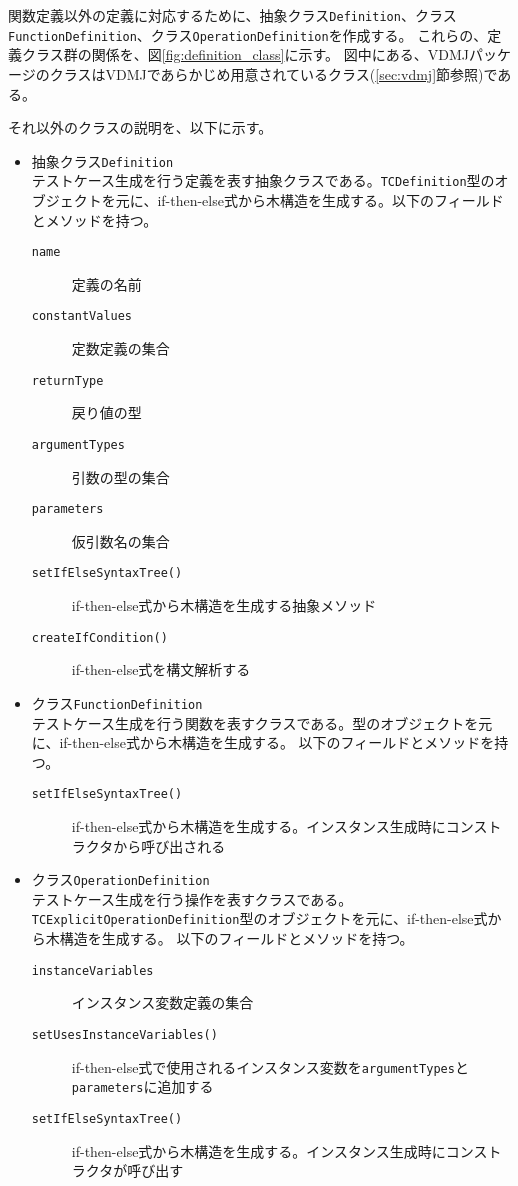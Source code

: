 \documentclass[uplatex, report, a4j, 10pt]{jsbook}
\newcommand\ttt[1]{\texttt{#1}}
\begin{document}
関数定義以外の定義に対応するために、抽象クラス\ttt{Definition}、クラス\ttt{FunctionDefinition}、クラス\ttt{OperationDefinition}を作成する。
これらの、定義クラス群の関係を、図\ref{fig:definition_class}に示す。
図中にある、VDMJパッケージのクラスはVDMJであらかじめ用意されているクラス(\ref{sec:vdmj}節参照)である。

それ以外のクラスの説明を、以下に示す。

\begin{itemize}
  \item 抽象クラス\ttt{Definition}\\
        テストケース生成を行う定義を表す抽象クラスである。\ttt{TCDefinition}型のオブジェクトを元に、if-then-else式から木構造を生成する\cite{tachiyama6}。以下のフィールドとメソッドを持つ。
        \begin{description}
          \item[\ttt{name}] 定義の名前
          \item[\ttt{constantValues}] 定数定義の集合
          \item[\ttt{returnType}] 戻り値の型
          \item[\ttt{argumentTypes}] 引数の型の集合
          \item[\ttt{parameters}] 仮引数名の集合
          \item[\ttt{setIfElseSyntaxTree()}] if-then-else式から木構造を生成する抽象メソッド
          \item[\ttt{createIfCondition()}] if-then-else式を構文解析する
        \end{description}

  \item クラス\ttt{FunctionDefinition}\\
        テストケース生成を行う関数を表すクラスである。\TCExplicitFunctionDefinition{}型のオブジェクトを元に、if-then-else式から木構造を生成する。
        以下のフィールドとメソッドを持つ。
        \begin{description}
          \item[\ttt{setIfElseSyntaxTree()}] if-then-else式から木構造を生成する。インスタンス生成時にコンストラクタから呼び出される
        \end{description}

  \item クラス\ttt{OperationDefinition}\\
        テストケース生成を行う操作を表すクラスである。\ttt{TCExplicitOperationDefinition}型のオブジェクトを元に、if-then-else式から木構造を生成する。
        以下のフィールドとメソッドを持つ。
        \begin{description}
          \item[\ttt{\ttt{instanceVariables}}] インスタンス変数定義の集合
          \item[\ttt{setUsesInstanceVariables()}] if-then-else式で使用されるインスタンス変数を\ttt{argumentTypes}と\ttt{parameters}に追加する
          \item[\ttt{setIfElseSyntaxTree()}] if-then-else式から木構造を生成する。インスタンス生成時にコンストラクタが呼び出す
        \end{description}


\end{itemize}
\end{document}
